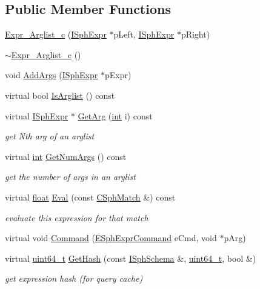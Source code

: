 \subsection*{Public Member Functions}
\begin{DoxyCompactItemize}
\item 
\hyperlink{structExpr__Arglist__c_a740b9730c9899c9b69b897ef2c67fa63}{Expr\-\_\-\-Arglist\-\_\-c} (\hyperlink{structISphExpr}{I\-Sph\-Expr} $\ast$p\-Left, \hyperlink{structISphExpr}{I\-Sph\-Expr} $\ast$p\-Right)
\item 
\hyperlink{structExpr__Arglist__c_a8cc72a85407fb391bdcef83c27164eb1}{$\sim$\-Expr\-\_\-\-Arglist\-\_\-c} ()
\item 
void \hyperlink{structExpr__Arglist__c_a805593bba412da5ae9f2afc80a8936e1}{Add\-Args} (\hyperlink{structISphExpr}{I\-Sph\-Expr} $\ast$p\-Expr)
\item 
virtual bool \hyperlink{structExpr__Arglist__c_a3ce94583170dcf69ba9b3071e1487c68}{Is\-Arglist} () const 
\item 
virtual \hyperlink{structISphExpr}{I\-Sph\-Expr} $\ast$ \hyperlink{structExpr__Arglist__c_a90caafbf2d27af8770a326ae7572bcf1}{Get\-Arg} (\hyperlink{sphinxexpr_8cpp_a4a26e8f9cb8b736e0c4cbf4d16de985e}{int} i) const 
\begin{DoxyCompactList}\small\item\em get Nth arg of an arglist \end{DoxyCompactList}\item 
virtual \hyperlink{sphinxexpr_8cpp_a4a26e8f9cb8b736e0c4cbf4d16de985e}{int} \hyperlink{structExpr__Arglist__c_a8f72bf633b21474f82b8647799613e2c}{Get\-Num\-Args} () const 
\begin{DoxyCompactList}\small\item\em get the number of args in an arglist \end{DoxyCompactList}\item 
virtual \hyperlink{sphinxexpr_8cpp_a0e0d0739f7035f18f949c2db2c6759ec}{float} \hyperlink{structExpr__Arglist__c_a2556e003115b6b7fa7f5844a12babba1}{Eval} (const \hyperlink{classCSphMatch}{C\-Sph\-Match} \&) const 
\begin{DoxyCompactList}\small\item\em evaluate this expression for that match \end{DoxyCompactList}\item 
virtual void \hyperlink{structExpr__Arglist__c_a8ce45ed6f01b3002ff23f072f3af1353}{Command} (\hyperlink{sphinxexpr_8h_a30be184fb07bd80c271360fc6094c818}{E\-Sph\-Expr\-Command} e\-Cmd, void $\ast$p\-Arg)
\item 
virtual \hyperlink{sphinxstd_8h_aaa5d1cd013383c889537491c3cfd9aad}{uint64\-\_\-t} \hyperlink{structExpr__Arglist__c_ad38c305d87be00f7b927fec2aef8f396}{Get\-Hash} (const \hyperlink{classISphSchema}{I\-Sph\-Schema} \&, \hyperlink{sphinxstd_8h_aaa5d1cd013383c889537491c3cfd9aad}{uint64\-\_\-t}, bool \&)
\begin{DoxyCompactList}\small\item\em get expression hash (for query cache) \end{DoxyCompactList}\end{DoxyCompactItemize}
